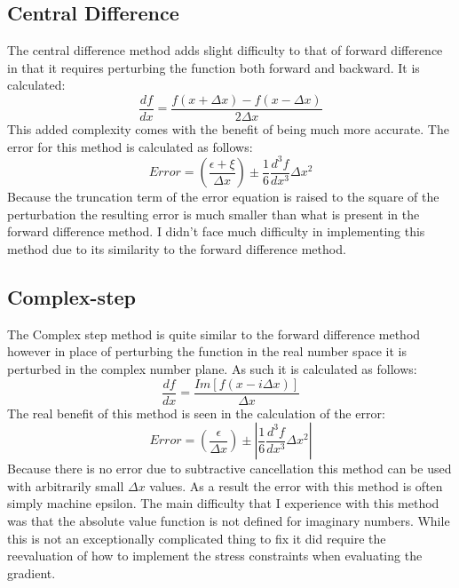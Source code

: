 \documentclass{article}
\begin{document}
\subsection{Central Difference}
The central difference method adds slight difficulty to that of forward difference in that it requires perturbing the function both forward and backward.  It is calculated:
\begin{equation}
\frac{df}{dx} = \frac{f\left(x + \Delta x\right) - f\left(x - \Delta x\right)}{2\Delta x}
\end{equation}
This added complexity comes with the benefit of being much more accurate.  The error for this method is calculated as follows:
\begin{equation}
Error = \left(\frac{\epsilon + \xi}{\Delta x}\right) \pm \frac{1}{6} \frac{d^3 f}{dx^3}\Delta x^2
\end{equation}
Because the truncation term of the error equation is raised to the square of the perturbation the resulting error is much smaller than what is present in the forward difference method.  I didn't face much difficulty in implementing this method due to its similarity to the forward difference method.
\subsection{Complex-step}
The Complex step method is quite similar to the forward difference method however in place of perturbing the function in the real number space it is perturbed in the complex number plane.  As such it is calculated as follows:
\begin{equation}
\frac{df}{dx} = \frac{Im\left[f\left(x - i\Delta x\right)\right]}{\Delta x}
\end{equation}
The real benefit of this method is seen in the calculation of the error:
\begin{equation}
Error = \left(\frac{\epsilon}{\Delta x}\right) \pm \left|\frac{1}{6} \frac{d^3 f}{dx^3}\Delta x^2\right|
\end{equation}
Because there is no error due to subtractive cancellation this method can be used with arbitrarily small $\Delta x$ values.  As a result the error with this method is often simply machine epsilon. The main difficulty that I experience with this method was that the absolute value function is not defined for imaginary numbers.  While this is not an exceptionally complicated thing to fix it did require the reevaluation of how to implement the stress constraints when evaluating the gradient. 
\end{document}
